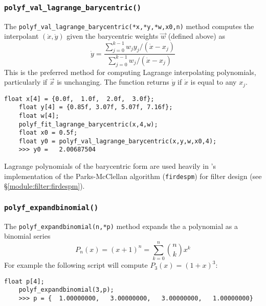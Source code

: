 \subsubsection{{\tt polyf\_val\_lagrange\_barycentric()}}
\label{module:math:poly:polyf_val_lagrange_barycentric}
The {\tt polyf\_val\_lagrange\_barycentric(*x,*y,*w,x0,n)} method
computes the interpolant $(\dot{x},\dot{y})$ given the barycentric
weights $\vec{w}$ (defined above) as
%
\begin{equation}
\label{eqn:math:poly:polyval_lagrange_barycentric}
    \dot{y} =   \frac{
                    \sum\limits_{j=0}^{k-1}{ w_j y_j /(\dot{x}-x_j) }
                } {
                    \sum\limits_{j=0}^{k-1}{     w_j /(\dot{x}-x_j) }
                }
\end{equation}
%
This is the preferred method for computing Lagrange interpolating polynomials,
particularly if $\vec{x}$ is unchanging.
The function returns $\dot{y}$ if $\dot{x}$ is equal to any $x_j$.
%
\begin{Verbatim}[fontsize=\small]
    float x[4] = {0.0f,  1.0f,  2.0f,  3.0f};
    float y[4] = {0.85f, 3.07f, 5.07f, 7.16f};
    float w[4]; 
    polyf_fit_lagrange_barycentric(x,4,w);
    float x0 = 0.5f;
    float y0 = polyf_val_lagrange_barycentric(x,y,w,x0,4);
    >>> y0 =   2.00687504
\end{Verbatim}
%
Lagrange polynomials of the barycentric form are used heavily in
\liquid's implementation of the Parks-McClellan algorithm
({\tt firdespm}) for filter design
(see \S\ref{module:filter:firdespm}).

\subsubsection{{\tt polyf\_expandbinomial()}}
\label{module:math:poly:polyf_expandbinomial}
The {\tt polyf\_expandbinomial(n,*p)} method
expands the a polynomial as a binomial series
%
\begin{equation}
\label{eqn:math:poly:expandbinomial}
    P_n(x) = (x+1)^n = \sum_{k=0}^{n}{ {n \choose k} x^k}
\end{equation}
%
For example the following script will compute
$P_3(x) = (1+x)^3$:
%
\begin{Verbatim}[fontsize=\small]
    float p[4];
    polyf_expandbinomial(3,p);
    >>> p = {  1.00000000,   3.00000000,   3.00000000,   1.00000000}
\end{Verbatim}
%

